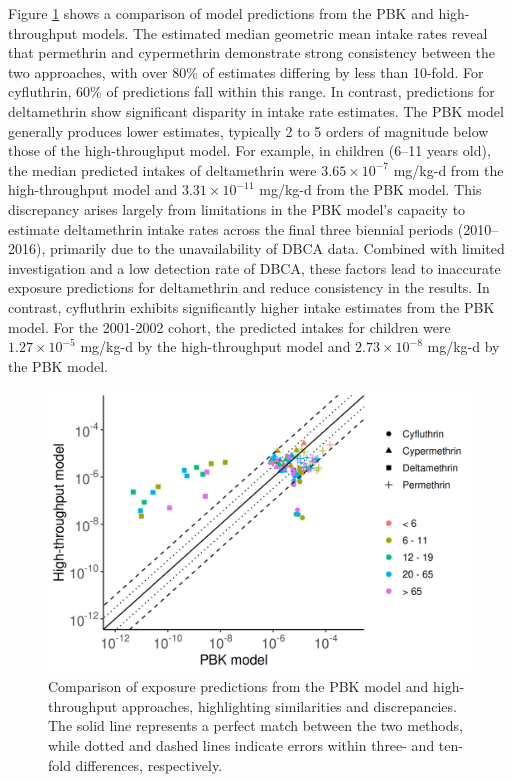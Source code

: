 \documentclass[toxics,article,submit,pdftex,moreauthors]{Definitions/mdpi}
\begin{document}
Figure \ref{fig:fig4} shows a comparison of model predictions from the PBK and
high-throughput models. The estimated median geometric mean intake rates
reveal that permethrin and cypermethrin demonstrate strong consistency between
the two approaches, with over 80\% of estimates differing by less than 10-fold.
For cyfluthrin, 60\% of predictions fall within this range. In contrast,
predictions for deltamethrin show significant disparity in intake rate
estimates. The PBK model generally produces lower estimates, typically 2 to 5
orders of magnitude below those of the high-throughput model. For example, in
children (6–11 years old), the median predicted intakes of deltamethrin were
\(3.65 \times 10^{-7}\) mg/kg-d from the high-throughput model and \(3.31
\times 10^{-11}\) mg/kg-d  from the PBK model. This discrepancy
arises largely from limitations in the PBK model’s capacity to estimate
deltamethrin intake rates across the final three biennial periods (2010–2016),
primarily due to the unavailability of DBCA data. Combined with limited
investigation and a low detection rate of DBCA, these factors lead to
inaccurate exposure predictions for deltamethrin and reduce consistency in the
results. In contrast, cyfluthrin exhibits significantly higher intake estimates
from the PBK model. For the 2001-2002 cohort, the predicted intakes for children
were \(1.27 \times 10^{-5}\) mg/kg-d by the high-throughput model and \(2.73
\times 10^{-8}\) mg/kg-d by the PBK model.
 


\begin{figure}[H]
\centering
\centering
\includegraphics[width=\linewidth]{figures/fig4_comparison}
\hfill
\caption{Comparison of exposure predictions from the PBK model and
high-throughput approaches, highlighting similarities and discrepancies. The
solid line represents a perfect match between the two methods, while dotted and
dashed lines indicate errors within three- and ten-fold differences,
respectively.\label{fig:fig4}}
\end{figure}
\end{document}
